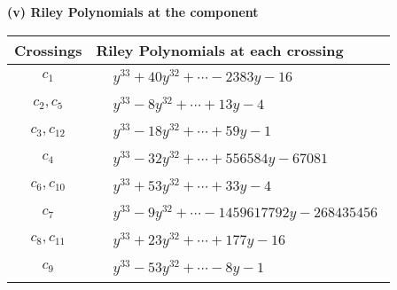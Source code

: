 \documentclass[1p]{elsarticle_modified}
\theoremstyle{definition}
\begin{document}
\newpage\renewcommand{\arraystretch}{1}
\flushleft \textbf{(v) Riley Polynomials at the component}\newline \\
\begin{tabular}{m{50pt}|m{274pt}}
Crossings & \hspace{64pt}Riley Polynomials at each crossing \\
\hline $$\begin{aligned}c_{1}\end{aligned}$$&$\begin{aligned}
&y^{33}+40 y^{32}+\cdots-2383 y-16
\end{aligned}$\\
\hline $$\begin{aligned}c_{2},c_{5}\end{aligned}$$&$\begin{aligned}
&y^{33}-8 y^{32}+\cdots+13 y-4
\end{aligned}$\\
\hline $$\begin{aligned}c_{3},c_{12}\end{aligned}$$&$\begin{aligned}
&y^{33}-18 y^{32}+\cdots+59 y-1
\end{aligned}$\\
\hline $$\begin{aligned}c_{4}\end{aligned}$$&$\begin{aligned}
&y^{33}-32 y^{32}+\cdots+556584 y-67081
\end{aligned}$\\
\hline $$\begin{aligned}c_{6},c_{10}\end{aligned}$$&$\begin{aligned}
&y^{33}+53 y^{32}+\cdots+33 y-4
\end{aligned}$\\
\hline $$\begin{aligned}c_{7}\end{aligned}$$&$\begin{aligned}
&y^{33}-9 y^{32}+\cdots-1459617792 y-268435456
\end{aligned}$\\
\hline $$\begin{aligned}c_{8},c_{11}\end{aligned}$$&$\begin{aligned}
&y^{33}+23 y^{32}+\cdots+177 y-16
\end{aligned}$\\
\hline $$\begin{aligned}c_{9}\end{aligned}$$&$\begin{aligned}
&y^{33}-53 y^{32}+\cdots-8 y-1
\end{aligned}$\\
\hline
\end{tabular}\\~\\
\end{document}
